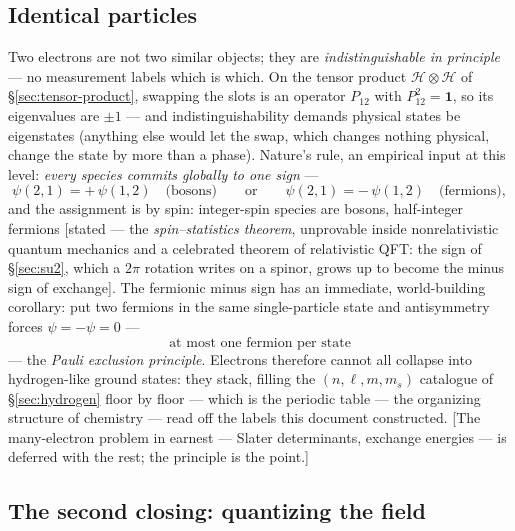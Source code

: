 \documentclass[11pt]{article}
\theoremstyle{plain}
\theoremstyle{definition}
\theoremstyle{remark}
\newcommand{\idop}{\mathbf{1}}  %
\begin{document}
\subsection{Identical particles}
\label{sec:identical}

Two electrons are not two similar objects; they are
\emph{indistinguishable in principle} --- no measurement labels
which is which. On the tensor product
$\mathcal H \otimes \mathcal H$ of \S\ref{sec:tensor-product},
swapping the slots is an operator $P_{12}$ with $P_{12}^2 = \idop$,
so its eigenvalues are $\pm1$ --- and indistinguishability demands
physical states be eigenstates (anything else would let the swap,
which changes nothing physical, change the state by more than a
phase). Nature's rule, an empirical input at this level:
\emph{every species commits globally to one sign} ---
\begin{equation}
  \psi(2, 1) = +\,\psi(1, 2)
  \quad\text{(bosons)}
  \qquad\text{or}\qquad
  \psi(2, 1) = -\,\psi(1, 2)
  \quad\text{(fermions)},
\end{equation}
and the assignment is by spin: integer-spin species are bosons,
half-integer fermions [stated --- the \emph{spin--statistics
theorem}, unprovable inside nonrelativistic quantum mechanics and a
celebrated theorem of relativistic QFT: the sign of
\S\ref{sec:su2}, which a $2\pi$ rotation writes on a spinor, grows
up to become the minus sign of exchange]. The fermionic minus sign
has an immediate, world-building corollary: put two fermions in the
same single-particle state and antisymmetry forces
$\psi = -\psi = 0$ ---
\begin{equation}
  \boxed{\;\text{at most one fermion per state}\;}
\end{equation}
--- the \emph{Pauli exclusion principle}. Electrons therefore
cannot all collapse into hydrogen-like ground states: they stack,
filling the $(n, \ell, m, m_s)$ catalogue of
\S\ref{sec:hydrogen} floor by floor --- which is the periodic
table --- the organizing structure of chemistry --- read off the
labels this document constructed. [The many-electron problem in earnest ---
Slater determinants, exchange energies --- is deferred with the
rest; the principle is the point.]

\subsection{The second closing: quantizing the field}
\label{sec:field-quantized}
\end{document}
